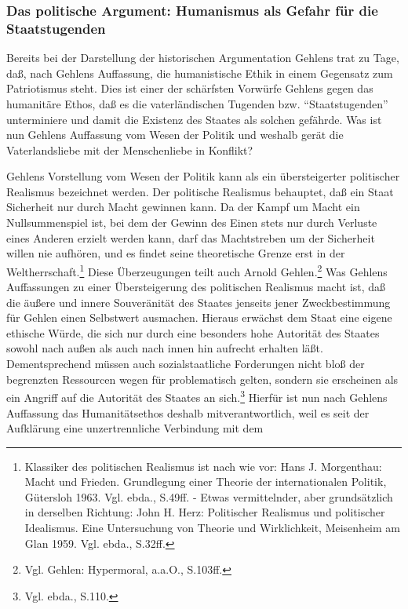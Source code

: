 \documentclass[12pt,a4paper]{article}
\begin{document}
\subsubsection{Das politische Argument: Humanismus als Gefahr für die Staatstugenden}

Bereits bei der Darstellung der historischen Argumentation Gehlens trat zu
Tage, daß, nach Gehlens Auf\/fassung, die humanistische Ethik in einem
Gegensatz zum Patriotismus steht. Dies ist einer der schärfsten Vorwürfe
Gehlens gegen das humanitäre Ethos, daß es die vaterländischen Tugenden
bzw. "`Staatstugenden"' unterminiere und damit die Existenz des Staates als
solchen gefährde. Was ist nun Gehlens Auf\/fassung vom Wesen der Politik
und weshalb gerät die Vaterlandsliebe mit der Menschenliebe in Konflikt?

Gehlens Vorstellung vom Wesen der Politik kann als ein übersteigerter
politischer Realismus bezeichnet werden. Der politische Realismus behauptet,
daß ein Staat Sicherheit nur durch Macht gewinnen kann. Da der Kampf um Macht
ein Nullsummenspiel ist, bei dem der Gewinn des Einen stets nur durch
Verluste eines Anderen erzielt werden kann, darf das Machtstreben um der
Sicherheit willen nie aufhören, und es findet seine theoretische Grenze erst
in der Weltherrschaft.\footnote{Klassiker des politischen Realismus ist nach
wie vor: Hans J. Morgenthau: Macht und Frieden. Grundlegung einer Theorie der
internationalen Politik, Gütersloh 1963. Vgl. ebda., S.49ff. - Etwas
vermittelnder, aber grundsätzlich in derselben Richtung: John H. Herz:
Politischer Realismus und politischer Idealismus. Eine Untersuchung von
Theorie und Wirklichkeit, Meisenheim am Glan 1959. Vgl. ebda., S.32ff.} Diese
Überzeugungen teilt auch Arnold Gehlen.\footnote{Vgl. Gehlen: Hypermoral,
a.a.O., S.103ff.} Was Gehlens Auf\/fassungen zu einer Übersteigerung des
politischen Realismus macht ist, daß die äußere und innere Souveränität des
Staates jenseits jener Zweckbestimmung für Gehlen einen Selbstwert
ausmachen. Hieraus erwächst dem Staat eine eigene ethische Würde, die sich
nur durch eine besonders hohe Autorität des Staates sowohl nach außen als
auch nach innen hin aufrecht erhalten läßt. Dementsprechend müssen auch
sozialstaatliche Forderungen nicht bloß der begrenzten Ressourcen wegen für
problematisch gelten, sondern sie erscheinen als ein Angriff auf die
Autorität des Staates an sich.\footnote{Vgl. ebda., S.110.} Hierfür ist nun
nach Gehlens Auffassung das Humanitätsethos deshalb mitverantwortlich, weil
es seit der Aufklärung eine unzertrennliche Verbindung mit dem
\end{document}
